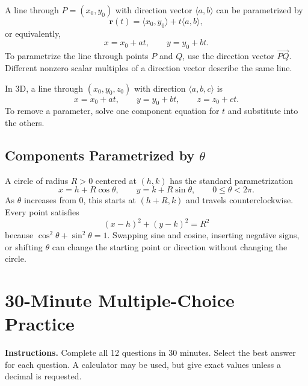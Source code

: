 \documentclass[12pt]{article}
\begin{document}
A line through $P=(x_0,y_0)$ with direction vector $\langle a,b\rangle$ can be parametrized by
\[
  \mathbf{r}(t)=\langle x_0,y_0\rangle+t\langle a,b\rangle,
\]
or equivalently,
\[
  x=x_0+at,\qquad y=y_0+bt.
\]
To parametrize the line through points $P$ and $Q$, use the direction vector $\overrightarrow{PQ}$. Different nonzero scalar multiples of a direction vector describe the same line.

In 3D, a line through $(x_0,y_0,z_0)$ with direction $\langle a,b,c\rangle$ is
\[
  x=x_0+at,\qquad y=y_0+bt,\qquad z=z_0+ct.
\]
To remove a parameter, solve one component equation for $t$ and substitute into the others.

\subsection*{Components Parametrized by $\theta$}
A circle of radius $R>0$ centered at $(h,k)$ has the standard parametrization
\[
  x=h+R\cos\theta,
  \qquad
  y=k+R\sin\theta,
  \qquad 0\le\theta<2\pi.
\]
As $\theta$ increases from $0$, this starts at $(h+R,k)$ and travels counterclockwise. Every point satisfies
\[
  (x-h)^2+(y-k)^2=R^2
\]
because $\cos^2\theta+\sin^2\theta=1$. Swapping sine and cosine, inserting negative signs, or shifting $\theta$ can change the starting point or direction without changing the circle.

\clearpage
\section*{30-Minute Multiple-Choice Practice}
\textbf{Instructions.} Complete all 12 questions in 30 minutes. Select the best answer for each question. A calculator may be used, but give exact values unless a decimal is requested.
\end{document}
